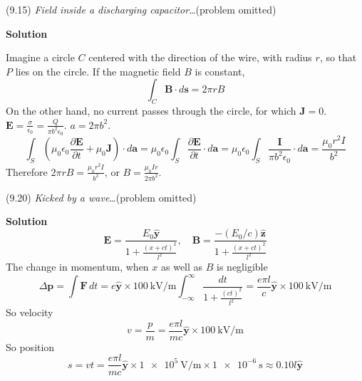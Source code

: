 \documentclass{article}
\begin{document}
\begin{homeworkProblem}
	(9.15) \textit{Field inside a discharging capacitor}\ldots (problem omitted)

	\textbf{Solution}

	Imagine a circle $C$ centered with the direction of the wire, with radius $r$, so that $P$ lies on the circle. If the magnetic field $B$ is constant,
	\[
		\int_C\mathbf{B}\cdot d\mathbf{s}=2\pi rB
	\]
	On the other hand, no current passes through the circle, for which $\mathbf{J}=0$. $\mathbf{E}=\frac{\sigma}{\epsilon_0}=\frac{Q}{\pi b^2\epsilon_0}$. $a=2\pi b^2$.
	\[
		\int_S\left(\mu_0\epsilon_0\frac{\partial\mathbf{E}}{\partial t}+\mu_0\mathbf{J}\right)\cdot d\mathbf{a}=\mu_0\epsilon_0\int_S\frac{\partial\mathbf{E}}{\partial t}\cdot d\mathbf{a}=\mu_0\epsilon_0\int_S\frac{\mathbf{I}}{\pi b^2\epsilon_0}\cdot d\mathbf{a}=\frac{\mu_0r^2I}{b^2}
	\]
	Therefore $2\pi rB=\frac{\mu_0r^2I}{b^2}$, or $B=\frac{\mu_0Ir}{2\pi b^2}$.
\end{homeworkProblem}


\begin{homeworkProblem}
	(9.20) \textit{Kicked by a wave}\ldots (problem omitted)

	\textbf{Solution}
	\begin{equation}\tag{9.28}
		\mathbf{E}=\frac{E_0\hat{\mathbf{y}}}{1+\frac{{(x+ct)}^2}{l^2}},\quad\mathbf{B}=\frac{-(E_0/c)\hat{\mathbf{z}}}{1+\frac{{(x+ct)}^2}{l^2}}
	\end{equation}
	The change in momentum, when $x$ as well as $B$ is negligible
	\[
		\Delta\mathbf{p}=\int\mathbf{F}\,dt=e\hat{\mathbf{y}}\times\SI{100}{\kilo\volt\per\m}\int_{-\infty}^\infty\frac{dt}{1+\frac{{(ct)}^2}{l^2}}=\frac{e\pi l}{c}\hat{\mathbf{y}}\times\SI{100}{\kilo\volt\per\m}
	\]
	So velocity
	\[
		v=\frac{p}{m}=\frac{e\pi l}{mc}\hat{\mathbf{y}}\times\SI{100}{\kilo\volt\per\m}
	\]
	So position
	\[
		s=vt=\frac{e\pi l}{mc}\hat{\mathbf{y}}\times\SI{1e5}{\volt\per\m}\times\SI{1e-6}{\s}\approx0.10l\hat{\mathbf{y}}
	\]
\end{homeworkProblem}

\end{document}
